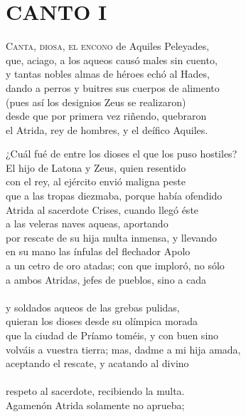 \bnum
\section*{\centering\textbf{CANTO I}}
%
\postart
\textsc{Canta, diosa, el encono} de Aquiles Peleyades,\\
que, aciago, a los aqueos causó males sin cuento,\\
y tantas nobles almas de héroes echó al Hades,\\
dando a perros y buitres sus cuerpos de alimento\\
(pues así los designios Zeus se realizaron)\\
desde que por primera vez riñendo, quebraron\\
el Atrida, rey de hombres, y el deífico Aquiles.\par
¿Cuál fué de entre los dioses el que los puso hostiles?\\
El hijo de Latona y Zeus, quien resentido\\
con el rey, al ejército envió maligna peste\\
que a las tropas diezmaba, porque había ofendido\\
Atrida al sacerdote Crises, cuando llegó éste\\
a las veleras naves aqueas, aportando\\
por rescate de su hija multa inmensa, y llevando\\
en su mano las ínfulas del flechador Apolo\\
a un cetro de oro atadas; con que imploró, no sólo\\
a ambos Atridas, jefes de pueblos, sino a cada\\
\\
y soldados aqueos de las grebas pulidas,\\
quieran los dioses desde su olímpica morada\\
que la ciudad de Príamo toméis, y con buen sino\\
volváis a vuestra tierra; mas, dadme a mi hija amada,\\
aceptando el rescate, y acatando al divino\\
\\
respeto al sacerdote, recibiendo la multa.\\
Agamenón Atrida solamente no aprueba;\\
